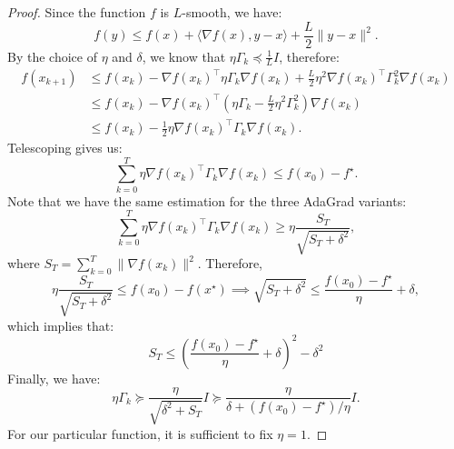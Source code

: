 \documentclass{article}
\theoremstyle{plain}
\theoremstyle{definition}
\theoremstyle{remark}
\newcommand{\innp}[2]{\langle #1, #2 \rangle}
\begin{document}
\begin{proof}
    Since the function $f$ is $L$-smooth, we have:
    \begin{equation*}
        f(y) \leq f(x) + \innp{\nabla f(x)}{y - x} + \frac{L}{2} \|y - x\|^2.
    \end{equation*}
    By the choice of $\eta$ and $\delta$, we know that $\eta \Gamma_k \preceq \frac{1}{L}I$, therefore:
    \begin{equation}
        \label{eq:descent-phenomena-large-delta}
        \begin{aligned}
            f(x_{k + 1}) &\leq f(x_k) - \nabla f(x_k)^\top \eta \Gamma_k\nabla f(x_k) + \frac{L}{2} \eta^2 \nabla f(x_k)^\top \Gamma_k^2 \nabla f(x_k)\\
            &\leq f(x_k) - \nabla f(x_k)^\top \left(\eta \Gamma_k - \frac{L}{2} \eta^2 \Gamma_k^2  \right)\nabla f(x_k) \\
            &\leq f(x_k) - \frac{1}{2} \eta \nabla f(x_k)^\top \Gamma_k \nabla f(x_k).
        \end{aligned}
    \end{equation}
    Telescoping gives us:
    \begin{equation*}
        \sum_{k = 0}^T \eta \nabla f(x_k)^\top \Gamma_k \nabla f(x_k) \leq f(x_0) - f^\star.
    \end{equation*}
    Note that we have the same estimation for the three AdaGrad variants:
    \begin{equation*}
        \sum_{k = 0}^T \eta \nabla f(x_k)^\top \Gamma_k \nabla f(x_k) \geq \eta\frac{S_T}{\sqrt{S_T + \delta^2}},
    \end{equation*}
    where $S_T = \sum_{k = 0}^T \|\nabla f(x_k)\|^2$. Therefore,
    \begin{equation}
        \label{eq:sum-square-grad-bounded}
        \eta\frac{S_T}{\sqrt{S_T + \delta^2}} \leq f(x_0) - f(x^\star) \implies \sqrt{S_T + \delta^2} \leq \frac{f(x_0) - f^\star}{\eta} + \delta,
    \end{equation}
    which implies that:
    \begin{equation*}
        S_T \leq \left(\frac{f(x_0) - f^\star}{\eta} + \delta\right)^2 - \delta^2
    \end{equation*}
    Finally, we have: 
    \begin{equation*}
        \eta \Gamma_k \succeq \frac{\eta}{\sqrt{\delta^2 + S_T}} I \succeq \frac{\eta}{\delta + (f(x_0) - f^\star) / \eta} I.
    \end{equation*}
    For our particular function, it is sufficient to fix $\eta = 1$.
\end{proof}
\end{document}

